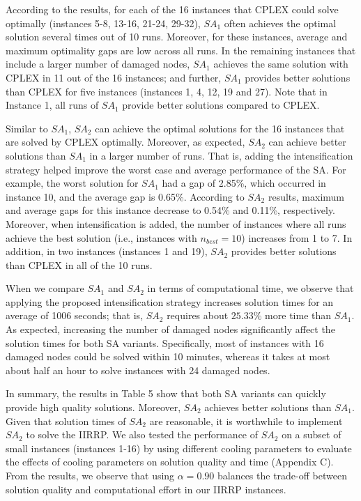 \documentclass[11pt]{article}
\begin{document}
According to the results, for each of the 16 instances that CPLEX could solve optimally (instances 5-8, 13-16, 21-24, 29-32), $SA_1$ often achieves the optimal solution several times out of 10 runs. Moreover, for these instances, average and maximum optimality gaps are low across all runs. In the remaining instances that include a larger number of damaged nodes, $SA_1$ achieves the same solution with CPLEX in 11 out of the 16 instances; and further, $SA_1$ provides better solutions than CPLEX for five instances (instances 1, 4, 12, 19 and 27). Note that in Instance 1, all runs of $SA_1$ provide better solutions compared to CPLEX.

Similar to $SA_1$, $SA_2$ can achieve the optimal solutions for the 16 instances that are solved by CPLEX optimally. Moreover, as expected, $SA_2$ can achieve better solutions than $SA_1$ in a larger number of runs. That is, adding the intensification strategy helped improve the worst case and average performance of the SA. For example, the worst solution for $SA_1$ had a gap of 2.85\%, which occurred in instance 10, and the average gap is 0.65\%. According to $SA_2$ results, maximum and average gaps for this instance decrease to 0.54\% and 0.11\%, respectively. Moreover, when intensification is added, the number of instances where all runs achieve the best solution (i.e., instances with $n_{best}=10$) increases from 1 to 7. In addition, in two instances (instances 1 and 19), $SA_2$ provides better solutions than CPLEX in all of the 10 runs.

When we compare $SA_1$ and $SA_2$ in terms of computational time, we observe that applying the proposed intensification strategy increases solution times for an average of 1006 seconds; that is, $SA_2$ requires about $25.33\%$ more time than $SA_1$. As expected, increasing the number of damaged nodes significantly affect the solution times for both SA variants. Specifically, most of instances with 16 damaged nodes could be solved within 10 minutes, whereas it takes at most about half an hour to solve instances with 24 damaged nodes. 

In summary, the results in Table 5 show that both SA variants can quickly provide high quality solutions. Moreover, $SA_2$ achieves better solutions than $SA_1$. Given that solution times of $SA_2$ are reasonable, it is worthwhile to implement $SA_2$ to solve the IIRRP. We also tested the performance of $SA_2$ on a subset of small instances (instances 1-16) by using different cooling parameters to evaluate the effects of cooling parameters on solution quality and time (Appendix C). From the results, we observe that using $\alpha=0.90$ balances the trade-off between solution quality and computational effort in our IIRRP instances.
\end{document}

